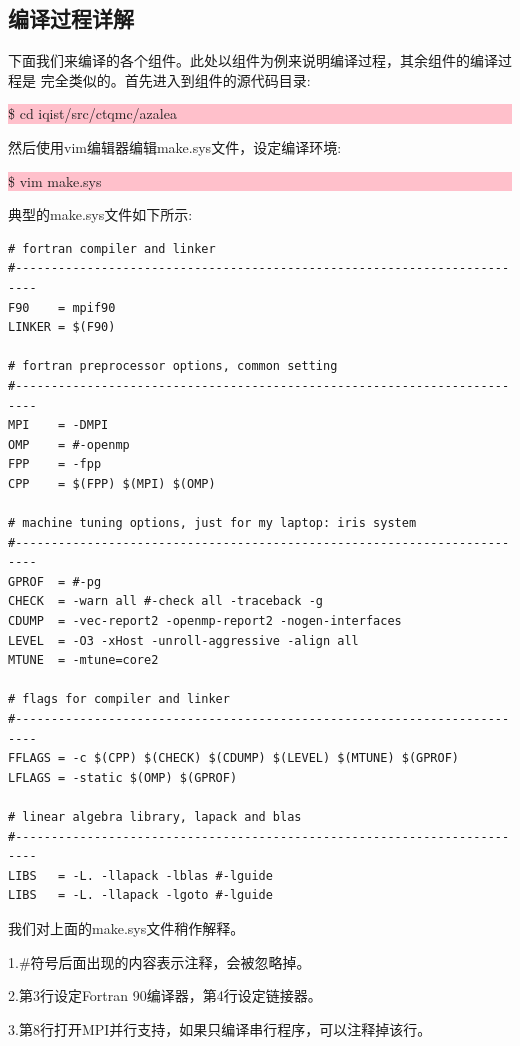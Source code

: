\subsection{编译过程详解}

下面我们来编译{\iqist}的各个组件。此处以{\azalea}组件为例来说明编译过程，其余组件的编译过程是
完全类似的。首先进入到{\azalea}组件的源代码目录:

\noindent\colorbox{pink}{\parbox[r]{\linewidth}{\quad \$ cd iqist/src/ctqmc/azalea}}

然后使用vim编辑器编辑make.sys文件，设定编译环境:

\noindent\colorbox{pink}{\parbox[r]{\linewidth}{\quad \$ vim make.sys}}

典型的make.sys文件如下所示:

\begin{lstlisting}[frame=single]
# fortran compiler and linker
#-------------------------------------------------------------------------
F90    = mpif90
LINKER = $(F90)

# fortran preprocessor options, common setting
#-------------------------------------------------------------------------
MPI    = -DMPI
OMP    = #-openmp
FPP    = -fpp
CPP    = $(FPP) $(MPI) $(OMP)

# machine tuning options, just for my laptop: iris system
#-------------------------------------------------------------------------
GPROF  = #-pg
CHECK  = -warn all #-check all -traceback -g
CDUMP  = -vec-report2 -openmp-report2 -nogen-interfaces
LEVEL  = -O3 -xHost -unroll-aggressive -align all
MTUNE  = -mtune=core2

# flags for compiler and linker
#-------------------------------------------------------------------------
FFLAGS = -c $(CPP) $(CHECK) $(CDUMP) $(LEVEL) $(MTUNE) $(GPROF)
LFLAGS = -static $(OMP) $(GPROF)

# linear algebra library, lapack and blas
#-------------------------------------------------------------------------
LIBS   = -L. -llapack -lblas #-lguide
LIBS   = -L. -llapack -lgoto #-lguide
\end{lstlisting}

我们对上面的make.sys文件稍作解释。

1.\#符号后面出现的内容表示注释，会被忽略掉。

2.第3行设定Fortran 90编译器，第4行设定链接器。

3.第8行打开MPI并行支持，如果只编译串行程序，可以注释掉该行。

